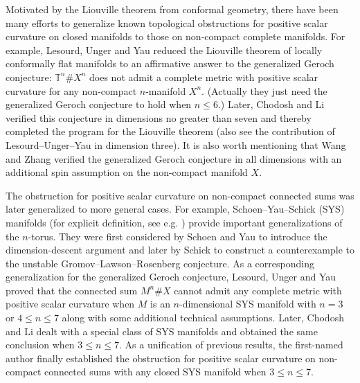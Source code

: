 \documentclass[11pt,letterpaper]{amsart}
\numberwithin{equation}{section}
\theoremstyle{definition}
\begin{document}
Motivated by the Liouville theorem from conformal geometry, there have been many efforts to generalize known topological obstructions for positive scalar curvature on closed manifolds to those on non-compact complete manifolds. For example, Lesourd, Unger and Yau \cite{LUY20} reduced the Liouville theorem of locally conformally flat manifolds to an affirmative answer to the generalized Geroch conjecture: $\mathbb{T}^{n}\# X^{n}$ does not admit a complete metric with positive scalar curvature for any non-compact $n$-manifold $X^{n}$. (Actually they just need the generalized Geroch conjecture to hold when $n\leq 6$.) Later, Chodosh and Li \cite{CL20} verified this conjecture in dimensions no greater than seven and thereby completed the program for the Liouville theorem (also see the contribution of Lesourd--Unger--Yau \cite{LUY20} in dimension three). It is also worth mentioning that Wang and Zhang \cite{WZ22} verified the generalized Geroch conjecture in all dimensions with an additional spin assumption on the non-compact manifold $X$.

The obstruction for positive scalar curvature on non-compact connected sums was later generalized to more general cases. For example, Schoen--Yau--Schick (SYS) manifolds (for explicit definition, see e.g. \cite[Section 5]{Gro18}) provide {important generalizations of the} $n$-torus. They were first considered by Schoen and Yau  \cite{SY79a} to introduce the dimension-descent argument and later by Schick \cite{Schi98} to construct a counterexample to the unstable Gromov--Lawson--Rosenberg conjecture. As a corresponding generalization for the generalized Geroch conjecture, Lesourd, Unger and Yau \cite{LUY20} proved that the connected sum $M^{n}\# X$ cannot admit any complete metric with positive scalar curvature when $M$ is an $n$-dimensional SYS manifold with $n=3$ or $4\leq n\leq7$ along with some additional technical assumptions.
Later, Chodosh and Li \cite{CL20} dealt with a special class of SYS manifolds and obtained the same conclusion when $3\leq n\leq 7$. As a unification of previous results,
the first-named author \cite{Chen22} finally established the obstruction for positive scalar curvature on non-compact connected sums with any closed SYS manifold when $3\leq n\leq 7$.
\end{document}
